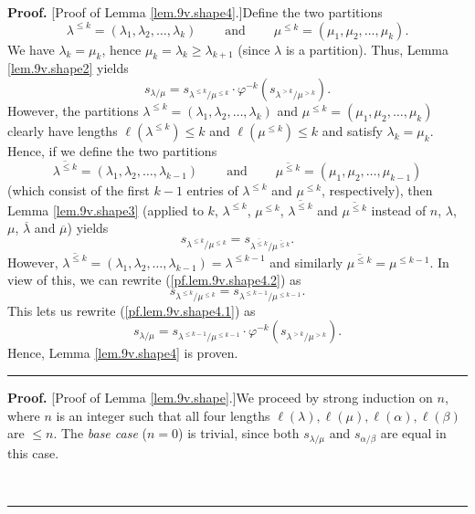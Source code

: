 \documentclass[numbers=enddot,12pt,final,onecolumn,notitlepage]{scrartcl}%
\theoremstyle{definition}
\newenvironment{proof}[1][Proof]{\noindent\textbf{#1.} }{\ \rule{0.5em}{0.5em}}
\begin{document}
\begin{enumerate}
\begin{proof}
[Proof of Lemma \ref{lem.9v.shape4}.]Define the two partitions%
\[
\lambda^{\leq k}=\left(  \lambda_{1},\lambda_{2},\ldots,\lambda_{k}\right)
\ \ \ \ \ \ \ \ \ \ \text{and}\ \ \ \ \ \ \ \ \ \ \mu^{\leq k}=\left(  \mu
_{1},\mu_{2},\ldots,\mu_{k}\right)  .
\]
We have $\lambda_{k}=\mu_{k}$, hence $\mu_{k}=\lambda_{k}\geq\lambda_{k+1}$
(since $\lambda$ is a partition). Thus, Lemma \ref{lem.9v.shape2} yields%
\begin{equation}
s_{\lambda/\mu}=s_{\lambda^{\leq k}/\mu^{\leq k}}\cdot\varphi^{-k}\left(
s_{\lambda^{>k}/\mu^{>k}}\right)  . \label{pf.lem.9v.shape4.1}%
\end{equation}
However, the partitions $\lambda^{\leq k}=\left(  \lambda_{1},\lambda
_{2},\ldots,\lambda_{k}\right)  $ and $\mu^{\leq k}=\left(  \mu_{1},\mu
_{2},\ldots,\mu_{k}\right)  $ clearly have lengths $\ell\left(  \lambda^{\leq
k}\right)  \leq k$ and $\ell\left(  \mu^{\leq k}\right)  \leq k$ and satisfy
$\lambda_{k}=\mu_{k}$. Hence, if we define the two partitions
\[
\overline{\lambda^{\leq k}}=\left(  \lambda_{1},\lambda_{2},\ldots
,\lambda_{k-1}\right)  \ \ \ \ \ \ \ \ \ \ \text{and}%
\ \ \ \ \ \ \ \ \ \ \overline{\mu^{\leq k}}=\left(  \mu_{1},\mu_{2},\ldots
,\mu_{k-1}\right)
\]
(which consist of the first $k-1$ entries of $\lambda^{\leq k}$ and $\mu^{\leq
k}$, respectively), then Lemma \ref{lem.9v.shape3} (applied to $k$,
$\lambda^{\leq k}$, $\mu^{\leq k}$, $\overline{\lambda^{\leq k}}$ and
$\overline{\mu^{\leq k}}$ instead of $n$, $\lambda$, $\mu$, $\overline
{\lambda}$ and $\overline{\mu}$) yields%
\begin{equation}
s_{\lambda^{\leq k}/\mu^{\leq k}}=s_{\overline{\lambda^{\leq k}}/\overline
{\mu^{\leq k}}}. \label{pf.lem.9v.shape4.2}%
\end{equation}
However, $\overline{\lambda^{\leq k}}=\left(  \lambda_{1},\lambda_{2}%
,\ldots,\lambda_{k-1}\right)  =\lambda^{\leq k-1}$ and similarly
$\overline{\mu^{\leq k}}=\mu^{\leq k-1}$. In view of this, we can rewrite
(\ref{pf.lem.9v.shape4.2}) as%
\[
s_{\lambda^{\leq k}/\mu^{\leq k}}=s_{\lambda^{\leq k-1}/\mu^{\leq k-1}}.
\]
This lets us rewrite (\ref{pf.lem.9v.shape4.1}) as%
\[
s_{\lambda/\mu}=s_{\lambda^{\leq k-1}/\mu^{\leq k-1}}\cdot\varphi^{-k}\left(
s_{\lambda^{>k}/\mu^{>k}}\right)  .
\]
Hence, Lemma \ref{lem.9v.shape4} is proven.
\end{proof}

\begin{proof}
[Proof of Lemma \ref{lem.9v.shape}.]We proceed by strong induction on $n$,
where $n$ is an integer such that all four lengths $\ell\left(  \lambda
\right)  ,\ell\left(  \mu\right)  ,\ell\left(  \alpha\right)  ,\ell\left(
\beta\right)  $ are $\leq n$. The \textit{base case} ($n=0$) is trivial, since
both $s_{\lambda/\mu}$ and $s_{\alpha/\beta}$ are equal in this case.


\end{proof}
\end{enumerate}
\end{document}
